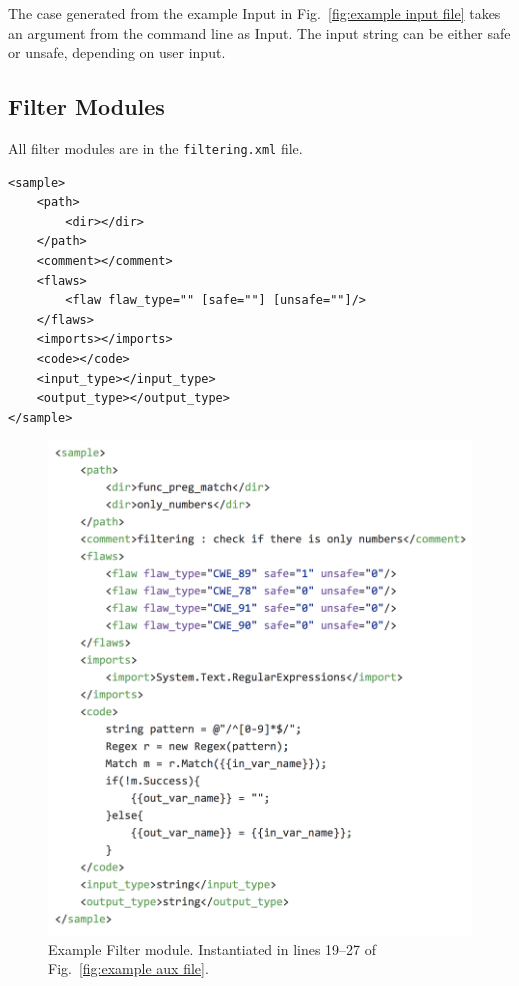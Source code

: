 \documentclass[12pt]{article}
\begin{document}
The case generated from the example Input in 
Fig.~\ref{fig:example input file}
takes an argument from the command line as Input.  
The input string can be either safe or unsafe, depending on user input.

\subsection{Filter Modules}

All filter modules are in the \verb|filtering.xml| file.

\begin{verbatim}
<sample>
    <path>
        <dir></dir>
    </path>
    <comment></comment>
    <flaws>
        <flaw flaw_type="" [safe=""] [unsafe=""]/>
    </flaws>
    <imports></imports>
    <code></code>
    <input_type></input_type>
    <output_type></output_type>
</sample>
\end{verbatim}

\begin{figure}[htbp]
  \includegraphics[width=\linewidth]{fig_Filter_file.png}
  \caption{Example Filter module. Instantiated in lines 19--27 of Fig.~\ref{fig:example aux file}.}
  \label{fig:example filter file}
\end{figure}
\end{document}
